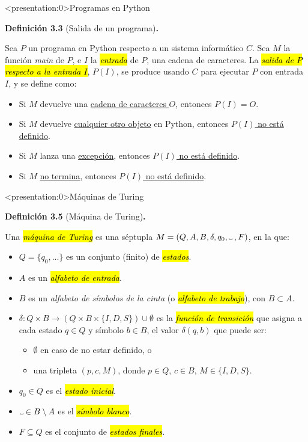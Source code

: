 \documentclass[10pt,xcolor=dvipsnames,aspectratio=169,spanish]{beamer}
\makeatletter
\let\HL\hl
\renewcommand\hl{%
  \let\set@color\beamerorig@set@color
  \let\reset@color\beamerorig@reset@color
  \HL}
\newcommand{\hle}[1]{\hl{\emph{#1}}}
\newcommand\Vtextvisiblespace[1][.3em]{%
\mbox{\kern.06em\vrule height.3ex}%
\vbox{\hrule width#1}%
\hbox{\vrule height.3ex}}
\makeatother
\begin{document}
\begin{frame}<presentation:0>{Programas en Python}

\textbf{Definición 3.3} (Salida de un programa)\textbf{.}

Sea $P$ un programa en Python respecto a un sistema informático $C$. Sea $M$ la función \emph{main} de $P$, e $I$ la \hle{entrada} de $P$, una cadena de caracteres. La \hle{salida de $P$ respecto a la entrada $I$}, $P(I)$, se produce usando $C$ para ejecutar $P$ con entrada $I$, y se define como:

\begin{itemize}
    \item Si $M$ devuelve una \ul{cadena de caracteres $O$}, entonces \ul{$P(I)=O$}.
    \item Si $M$ devuelve \ul{cualquier otro objeto} en Python, entonces \ul{$P(I)$ no está definido}.
    \item Si $M$ lanza una \ul{excepción}, entonces \ul{$P(I)$ no está definido}.
    \item Si $M$ \ul{no termina}, entonces \ul{$P(I)$ no está definido}.
\end{itemize}

\end{frame}

\begin{frame}<presentation:0>{Máquinas de Turing}

\textbf{Definición 3.5} (Máquina de Turing)\textbf{.}

Una \hle{máquina de Turing} es una séptupla $M=(Q, A, B, \delta, q_0, \Vtextvisiblespace\:, F)$, en la que:

\begin{itemize}
    \item $Q = \{q_0, ...\}$ es un conjunto (finito) de \hle{estados}.
    \item $A$ es un \hle{alfabeto de entrada}.
    \item $B$ es un \emph{alfabeto de símbolos de la cinta} (o \hle{alfabeto de trabajo}), con \ul{$B\subset A$}.
    \item $\delta : Q \times B \longrightarrow (Q \times B \times \{I, D, S\}) \cup \emptyset$ es la \hle{función de transición} que asigna a cada estado $q\in Q$ y símbolo $b\in B$, el valor $\delta(q, b)$ que puede ser:
    \begin{itemize}
        \item $\emptyset$ en caso de no estar definido, o
        \item una tripleta $(p, c, M)$, donde $p\in Q$, $c\in B$, $M \in \{I, D, S\}$.
    \end{itemize}
    \item $q_0\in Q$ es el \hle{estado inicial}.
    \item $\Vtextvisiblespace\in B \setminus A$ es el \hle{símbolo blanco}.
    \item $F \subseteq Q$ es el conjunto de \hle{estados finales}.
\end{itemize}

\end{frame}
\end{document}
